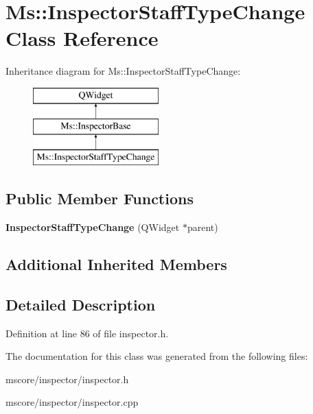 \hypertarget{class_ms_1_1_inspector_staff_type_change}{}\section{Ms\+:\+:Inspector\+Staff\+Type\+Change Class Reference}
\label{class_ms_1_1_inspector_staff_type_change}
Inheritance diagram for Ms\+:\+:Inspector\+Staff\+Type\+Change\+:\begin{figure}[H]
\begin{center}
\leavevmode
\includegraphics[height=3.000000cm]{class_ms_1_1_inspector_staff_type_change}
\end{center}
\end{figure}
\subsection*{Public Member Functions}
\begin{DoxyCompactItemize}
\item 
\mbox{\label{class_ms_1_1_inspector_staff_type_change_adeb05ec82af039e5ddb840df42ba9fde}} 
{\bfseries Inspector\+Staff\+Type\+Change} (Q\+Widget $\ast$parent)
\end{DoxyCompactItemize}
\subsection*{Additional Inherited Members}


\subsection{Detailed Description}


Definition at line 86 of file inspector.\+h.



The documentation for this class was generated from the following files\+:\begin{DoxyCompactItemize}
\item 
mscore/inspector/inspector.\+h\item 
mscore/inspector/inspector.\+cpp\end{DoxyCompactItemize}
